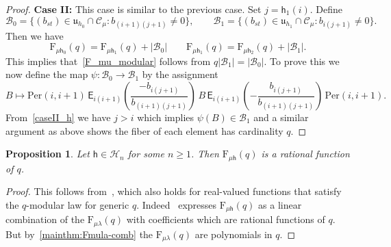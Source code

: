 \documentclass[12pt,a4paper,reqno]{amsart}
\theoremstyle{plain}
\newtheorem{proposition}[theorem]{Proposition}
\theoremstyle{definition}
\newcommand{\1}{\mathds{1}}
\newcommand{\F}{\mathrm{F}}
\renewcommand{\u}{\mathfrak{u}}
\newcommand{\hes}{\mathsf{h}}
\newcommand{\EE}{\mathsf{E}}
\begin{document}
\begin{proof}
 
\medskip

{\noindent \bf Case II:} This case is similar to the previous case. Set $j=\hes_1(i)$. Define 
$$
\mathcal{B}_0=\{(b_{st})\in \u_{h_0}\cap\mathcal{C}_\mu: b_{(i+1)(j+1)}\neq 0\},\qquad \mathcal{B}_1=\{(b_{st})\in \u_{h_1}\cap\mathcal{C}_\mu: b_{i(j+1)}\neq 0\}.
$$
Then we have 
$$
\F_{\mu\hes_0}(q)=\F_{\mu\hes_1}(q)+|\mathcal{B}_0|\qquad
\F_{\mu\hes_1}(q)=\F_{\mu\hes_2}(q)+|\mathcal{B}_1|. 
$$
This implies that~\cref{F_mu_modular} follows from $q|\mathcal{B}_1|=|\mathcal{B}_0|$. To prove this we now define
the map 
$\psi: \mathcal{B}_0\to \mathcal{B}_1
$
by the assignment  
$$
B\mapsto \mathrm{Per}(i,i+1)\,\EE_{i(i+1)}\left(\frac{-b_{i(j+1)}}{b_{(i+1)(j+1)}}\right)\,B\,\EE_{i(i+1)}\left(-\frac{b_{i(j+1)}}{b_{(i+1)(j+1)}}\right)\,\mathrm{Per}(i,i+1).
$$
From~\cref{caseII_h} we have $j>i$ which implies $\psi(B)\in \mathcal{B}_1$ and a similar argument as above shows the fiber of each element has cardinality $q$. 
\end{proof}
\begin{proposition}\label{F_mu_rational} Let $\hes\in\mathcal{H}_n$ for some $n\geq 1$. Then  $\F_{\mu\hes}(q)$ is a rational function of $q$.    
\end{proposition}
\begin{proof}
This follows from~\cite[Theorem 1.2, Algorithm 2.8]{Abreu-Nigro}, which also holds for real-valued functions that satisfy the $q$-modular law for generic $q$. Indeed~\cite[Algorithm 2.8]{Abreu-Nigro} expresses $\F_{\mu\hes}(q)$ as a linear combination of the $\F_{\mu\lambda}(q)$ with coefficients which are rational functions of $q$. 
But by~\cref{mainthm:Fmula-comb} the $\F_{\mu\lambda}(q)$ are polynomials in $q$.
\end{proof}
\end{document}
